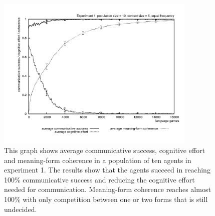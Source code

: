 \begin{figure}[htb]
\centerline{\includegraphics[width=0.85\textwidth]{Chapter4/figs/effort2a}}
  \caption[Experiment 1: success, effort and coherence]{This graph shows average communicative success, cognitive effort and meaning-form coherence in a population of ten agents in experiment 1. The results show that the agents succeed in reaching 100\% communicative success and reducing the cognitive effort needed for communication. Meaning-form coherence reaches almost 100\% with only competition between one or two forms that is still undecided.}
   \label{f:effort1}
\end{figure}

